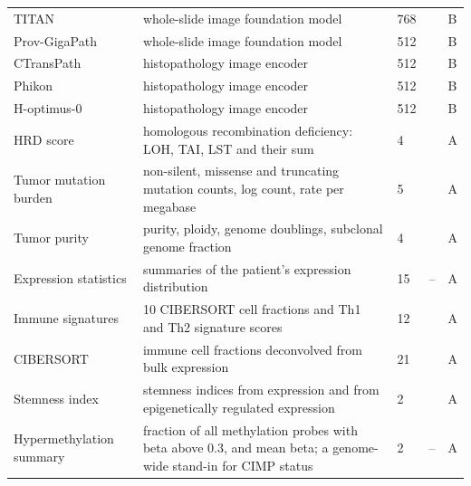 \begin{longtable}{P{3.0cm}P{5.0cm}P{1.5cm}P{1.5cm}P{1.4cm}}
TITAN & whole-slide image foundation model & 768 & \citep{Ding2024TITAN} & B \\
Prov-GigaPath & whole-slide image foundation model & 512 & \citep{Xu2024GigaPath} & B \\
CTransPath & histopathology image encoder & 512 & \citep{Wang2022CTransPath} & B \\
Phikon & histopathology image encoder & 512 & \citep{Filiot2023} & B \\
H-optimus-0 & histopathology image encoder & 512 & \citep{Saillard2024} & B \\
HRD score & homologous recombination deficiency: LOH, TAI, LST and their sum & 4 & \citep{Knijnenburg2018} & A \\
Tumor mutation burden & non-silent, missense and truncating mutation counts, log count, rate per megabase & 5 & \citep{Ellrott2018} & A \\
Tumor purity & purity, ploidy, genome doublings, subclonal genome fraction & 4 & \citep{Carter2012} & A \\
Expression statistics & summaries of the patient's expression distribution & 15 & -- & A \\
Immune signatures & 10 CIBERSORT cell fractions and Th1 and Th2 signature scores & 12 & \citep{Thorsson2018} & A \\
CIBERSORT & immune cell fractions deconvolved from bulk expression & 21 & \citep{Newman2015, Thorsson2018} & A \\
Stemness index & stemness indices from expression and from epigenetically regulated expression & 2 & \citep{Malta2018} & A \\
Hypermethylation summary & fraction of all methylation probes with beta above 0.3, and mean beta; a genome-wide stand-in for CIMP status \citep{Toyota1999} & 2 & -- & A \\
\end{longtable}

